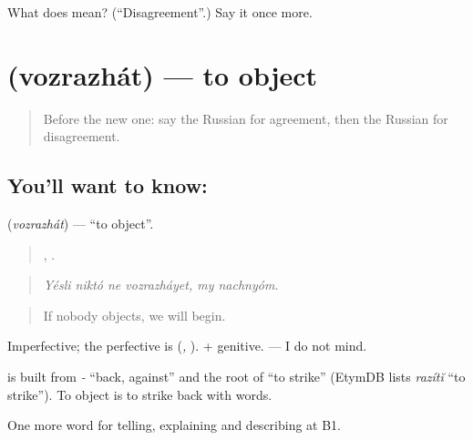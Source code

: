 \begin{tcolorbox}[breakable,colback=teal!4,colframe=teal!35!black,title={Before you move on}]
What does  mean? (\textquotedblleft{}Disagreement\textquotedblright{}.) Say it once more.
\end{tcolorbox}
\section[\texorpdfstring{\ru{возражать} (vozrazhát)}{возражать (vozrazhát)}]{ (vozrazhát) — to object}

\label{lesson:RU-C340-vozrazhat}



\begin{quote}
Before the new one: say the Russian for agreement, then the Russian for disagreement.
\end{quote}

\subsection*{You'll want to know: }
\textbf{} (\emph{vozrazhát}) — \textquotedblleft{}to object\textquotedblright{}.

\begin{quote}
   ,  .
\end{quote}

\begin{quote}
\emph{Yésli niktó ne vozrazháyet, my nachnyóm.}
\end{quote}

\begin{quote}
If nobody objects, we will begin.
\end{quote}

Imperfective; the perfective is \emph{} (\emph{, }). \emph{ } + genitive. \emph{  } — I do not mind.

\begin{cousinweb}
\textbf{} is built from \emph{-} \textquotedblleft{}back, against\textquotedblright{} and the root of \emph{} \textquotedblleft{}to strike\textquotedblright{} (EtymDB lists \emph{razítĭ} \textquotedblleft{}to strike\textquotedblright{}). To object is to strike back with words.
\end{cousinweb}

\begin{grammarlens}[title={What you've built}]
One more word for telling, explaining and describing at B1.
\end{grammarlens}

